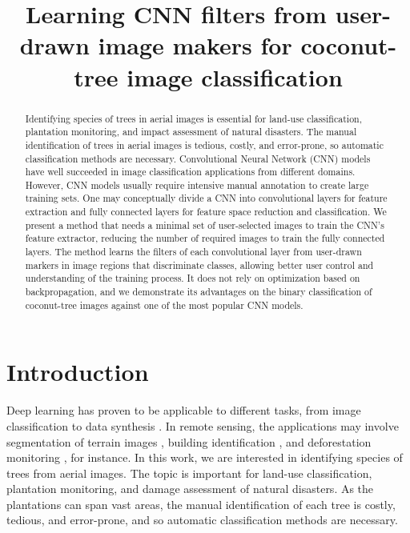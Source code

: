 \documentclass[a4paper,conference]{IEEEtran}
\begin{document}
\title{Learning CNN filters from user-drawn image makers for coconut-tree image classification}

\maketitle

\begin{abstract}
Identifying species of trees in aerial images is essential for land-use classification, plantation monitoring, and impact assessment of natural disasters. The manual identification of trees in aerial images is tedious, costly, and error-prone, so automatic classification methods are necessary. Convolutional Neural Network (CNN) models have well succeeded in image classification applications from different domains. However, CNN models usually require intensive manual annotation to create large training sets. One may conceptually divide a CNN into convolutional layers for feature extraction and fully connected layers for feature space reduction and classification. We present a method that needs a minimal set of user-selected images to train the CNN's feature extractor, reducing the number of required images to train the fully connected layers. The method learns the filters of each convolutional layer from user-drawn markers in image regions that discriminate classes, allowing better user control and understanding of the training process. It does not rely on optimization based on backpropagation, and we demonstrate its advantages on the binary classification of coconut-tree images against one of the most popular CNN models.
\end{abstract}

\section{Introduction}
Deep learning has proven to be applicable to different tasks, from image classification to data synthesis \cite{goodfellow2016deep}. In remote sensing, the applications may involve segmentation of terrain images \cite{kemker2018algorithms, kampffmeyer2016semantic, hamaguchi2018effective}, building identification \cite{xu2018building, lu2018detecting, liu2018multilevel}, and deforestation monitoring \cite{bragilevsky2017deep}, for instance. In this work, we are interested in identifying species of trees from aerial images. The topic is important for land-use classification, plantation monitoring, and damage assessment of natural disasters. As the plantations can span vast areas, the manual identification of each tree is costly, tedious, and error-prone, and so automatic classification methods are necessary. 
\end{document}
